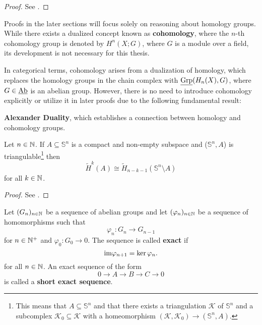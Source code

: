 \begin{proof}
  See \cite[Corollary 2.25]{hatcher}.
\end{proof}
Proofs in the later sections will focus solely on reasoning about homology groups. While there exists a dualized concept known as \textbf{cohomology}, where the $n$-th cohomology group is denoted by \( H^n(X; G) \), where \( G \) is a module over a field, its development is not necessary for this thesis.

In categorical terms, cohomology arises from a dualization of homology, which replaces the homology groups in the chain complex with \( \underline{\rm Grp}(H_n(X), G) \), where \( G \in \underline{\rm Ab} \) is an abelian group. However, there is no need to introduce cohomology explicitly or utilize it in later proofs due to the following fundamental result: 

\textbf{Alexander Duality}, which establishes a connection between homology and cohomology groups.

\begin{thm}\label{thm:alex}
  Let $n \in \mathbb{N}$. If $A \subseteq \mathbb{S}^n$ is a compact and non-empty subspace and ($\mathbb{S}^n, A$) is triangulable\footnote{This means that $A \subseteq \mathbb{S}^n$ and that there exists a triangulation $\mathcal{K}$ of $\mathbb{S}^n$ and a subcomplex $\mathcal{K}_0 \subseteq \mathcal{K}$ with a homeomorphism $(\mathcal{K}, \mathcal{K}_0) \to (\mathbb{S}^n, A)$.} then
  \begin{equation*}
    \tilde{H}^k(A) \cong \tilde{H}_{n-k-1}(\mathbb{S}^n \setminus A)
  \end{equation*}
  for all $k \in \mathbb{N}$.
\end{thm}

\begin{proof}
  See \cite[Theorem 71.1]{MunAlTop}.
\end{proof}

\begin{defin}
  Let $(G_n)_{n\in\mathbb{N}}$ be a sequence of abelian groups and let $(\varphi_n)_{n\in\mathbb{N}}$ be a sequence of homomorphisms such that
  \begin{equation*}
    \varphi_n\colon G_n \to G_{n-1}
  \end{equation*}
  for $n \in \mathbb{N}^+$ and $\varphi_0\colon G_0 \to 0$.
  The sequence is called \textbf{exact} if
  \begin{equation*}
    {\rm im}\varphi_{n+1} = \ker\varphi_n.
  \end{equation*}
  for all $n \in \mathbb{N}$.
  An exact sequence of the form
  \begin{equation*}
    0 \to A \to B \to C \to 0
  \end{equation*}
  is called a \textbf{short exact sequence}.
\end{defin}

